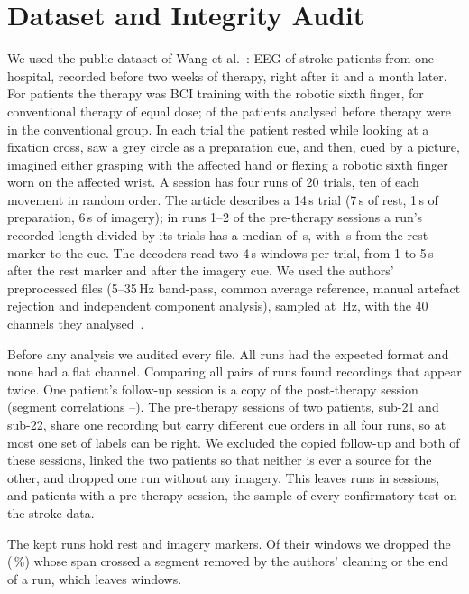\section{Dataset and Integrity Audit}
\label{sec:dataset}
We used the public dataset of Wang et al.~\cite{wang2026dataset,wang2026figshare}:
EEG of \nSubjects{} stroke patients from one hospital, recorded before two
weeks of therapy, right after it and a month later. For \nPostGroupB{}
patients the therapy was BCI training with the robotic sixth finger, for
\nPostGroupT{} conventional therapy of equal dose; \nPreGroupT{} of the
\nPre{} patients analysed before therapy were in the conventional group. In
each trial the patient rested while looking at a fixation cross, saw a grey
circle as a preparation cue, and then, cued by a picture, imagined either
grasping with the affected hand or flexing a robotic sixth finger worn on the
affected wrist. A session has four runs of 20 trials, ten of each movement
in random order. The article describes a 14\,s trial (7\,s of rest, 1\,s of
preparation, 6\,s of imagery); in runs 1--2 of the pre-therapy sessions a
run's recorded length divided by its trials has a median of
\rqTwoTrialSecondsRecorded\,s, with \rqTwoRestSecondsRecorded\,s from the rest
marker to the cue. The decoders read two 4\,s windows per trial, from 1 to
5\,s after the rest marker and after the imagery cue. We used the
authors' preprocessed files (5--35\,Hz band-pass, common average reference,
manual artefact rejection and independent component analysis), sampled at
\nSamplingRate\,Hz, with the 40 channels they analysed~\cite{wang2026dataset}.

Before any analysis we audited every file. All \nRuns{} runs had the expected
format and none had a flat channel. Comparing all \auditPairsScreened{} pairs
of runs found recordings that appear twice. One patient's follow-up session
is a copy of the post-therapy session (segment correlations
\auditFollowCopyCorrMin--\auditFollowCopyCorrMax). The pre-therapy sessions of
two patients, sub-21 and sub-22, share one recording but carry different cue
orders in all four runs, so at most one set of labels can be right. We
excluded the copied follow-up and both of these sessions, linked the two
patients so that neither is ever a source for the other, and dropped one run
without any imagery. This leaves \nRunsKept{} runs in \nSessionsKept{}
sessions, and \nPre{} patients with a pre-therapy session, the sample of
every confirmatory test on the stroke data.

The kept runs hold \nEvents{} rest and imagery markers. Of their windows we
dropped the \nWindowsDropped{}
(\nWindowsDroppedPct\,\%) whose span crossed a segment removed by the
authors' cleaning or the end of a run, which leaves \nWindows{} windows.
